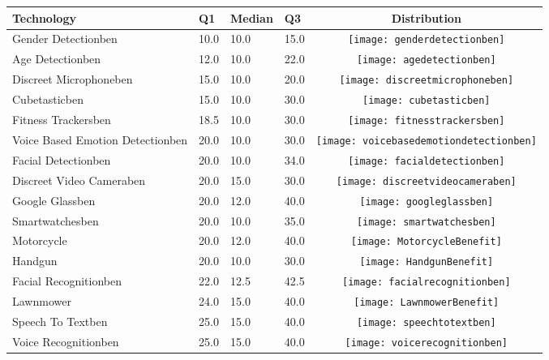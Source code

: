 \begin{table}[t]
\begin{center}
\small
\begin{tabular}{| p{2cm} | p{1cm} | p{1cm} | p{1cm} | c |}
\hline
Technology & Q1 &  Median & Q3 & Distribution  \\ 
\hline
Gender Detectionben & 10.0 & 10.0 & 15.0 & \texttt{[image: genderdetectionben]} \\ 
Age Detectionben & 12.0 & 10.0 & 22.0 & \texttt{[image: agedetectionben]} \\ 
Discreet Microphoneben & 15.0 & 10.0 & 20.0 & \texttt{[image: discreetmicrophoneben]} \\ 
Cubetasticben & 15.0 & 10.0 & 30.0 & \texttt{[image: cubetasticben]} \\ 
Fitness Trackersben & 18.5 & 10.0 & 30.0 & \texttt{[image: fitnesstrackersben]} \\ 
Voice Based Emotion Detectionben & 20.0 & 10.0 & 30.0 & \texttt{[image: voicebasedemotiondetectionben]} \\ 
Facial Detectionben & 20.0 & 10.0 & 34.0 & \texttt{[image: facialdetectionben]} \\ 
Discreet Video Cameraben & 20.0 & 15.0 & 30.0 & \texttt{[image: discreetvideocameraben]} \\ 
Google Glassben & 20.0 & 12.0 & 40.0 & \texttt{[image: googleglassben]} \\ 
Smartwatchesben & 20.0 & 10.0 & 35.0 & \texttt{[image: smartwatchesben]} \\ 
Motorcycle & 20.0 & 12.0 & 40.0 & \texttt{[image: MotorcycleBenefit]} \\ 
Handgun & 20.0 & 10.0 & 30.0 & \texttt{[image: HandgunBenefit]} \\ 
Facial Recognitionben & 22.0 & 12.5 & 42.5 & \texttt{[image: facialrecognitionben]} \\ 
Lawnmower & 24.0 & 15.0 & 40.0 & \texttt{[image: LawnmowerBenefit]} \\ 
Speech To Textben & 25.0 & 15.0 & 40.0 & \texttt{[image: speechtotextben]} \\ 
Voice Recognitionben & 25.0 & 15.0 & 40.0 & \texttt{[image: voicerecognitionben]} \\ 

\end{tabular}
\end{center}
\end{table}
